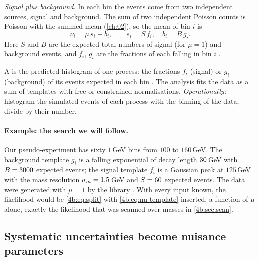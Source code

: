 \emph{Signal plus background.} In each bin the events come from two independent
sources, signal and background. The sum of two independent Poisson counts is Poisson
with the summed mean (\cref{ch:02}), so the mean of bin $i$ is
\begin{equation}
  \nu_i=\mu\,s_i+b_i,
  \qquad
  s_i=S\,f_i,\quad b_i=B\,g_i .
  \label{4b:eq:nu-template}
\end{equation}
Here $S$ and $B$ are the expected total numbers of signal (for $\mu=1$) and
background events, and $f_i$, $g_i$ are the fractions of each falling in bin $i$
\cite[(2)--(4)]{Cowan2011}.

\begin{workdef}[template]
A  is the predicted histogram of one process: the fractions $f_i$
(signal) or $g_i$ (background) of its events expected in each bin . The analysis fits the data as a sum of templates with free or constrained
normalisations. \emph{Operationally:} histogram the simulated events of each process
with the binning of the data, divide by their number.
\end{workdef}

\paragraph{Example: the search we will follow.}
Our pseudo-experiment has sixty $1\,$GeV
bins from $100$ to $160\,$GeV. The background template $g_i$ is a falling exponential
of decay length $30\,$GeV with $B=3000$ expected events; the signal
template $f_i$ is a Gaussian peak at $125\,$GeV with the mass resolution
$\sigma_m=1.5\,$GeV and $S=60$ expected events. The data were
generated with $\mu=1$ by the library . With every input known, the likelihood would be
\eqref{4b:eq:split} with \eqref{4b:eq:nu-template} inserted, a function of $\mu$
alone, exactly the likelihood that was scanned over masses in \cref{4b:sec:scan}.

\subsection{Systematic uncertainties become nuisance parameters}
\label{4b:sec:nuisance-hep}

